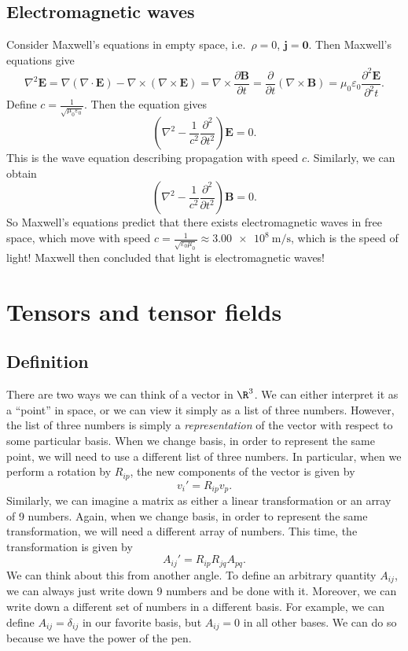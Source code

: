 \documentclass[a4paper]{article}
\begin{document}
\subsection{Electromagnetic waves}
Consider Maxwell's equations in empty space, i.e.\ $\rho = 0$, $\mathbf{j} = \mathbf{0}$. Then Maxwell's equations give
\[
  \nabla^2 \mathbf{E} = \nabla(\nabla\cdot \mathbf{E}) - \nabla\times (\nabla\times \mathbf{E}) = \nabla\times \frac{\partial \mathbf{B}}{\partial t} = \frac{\partial}{\partial t} (\nabla \times \mathbf{B}) = \mu_0\varepsilon_0 \frac{\partial^2 \mathbf{E}}{\partial^2 t}.
\]
Define $c = \frac{1}{\sqrt{\mu_0\varepsilon_0}}$. Then the equation gives
\[
  \left(\nabla^2 - \frac{1}{c^2}\frac{\partial^2}{\partial t^2}\right)\mathbf{E} = 0.
\]
This is the wave equation describing propagation with speed $c$. Similarly, we can obtain
\[
  \left(\nabla^2 - \frac{1}{c^2}\frac{\partial^2}{\partial t^2}\right)\mathbf{B} = 0.
\]
So Maxwell's equations predict that there exists electromagnetic waves in free space, which move with speed $c = \frac{1}{\sqrt{\varepsilon_0 \mu_0}} \approx \SI{3.00e8}{\meter\per\second}$, which is the speed of light! Maxwell then concluded that light is electromagnetic waves!

\section{Tensors and tensor fields}
\subsection{Definition}
There are two ways we can think of a vector in $\R^3$. We can either interpret it as a ``point'' in space, or we can view it simply as a list of three numbers. However, the list of three numbers is simply a \emph{representation} of the vector with respect to some particular basis. When we change basis, in order to represent the same point, we will need to use a different list of three numbers. In particular, when we perform a rotation by $R_{ip}$, the new components of the vector is given by
\[
  v_i' = R_{ip}v_p.
\]
Similarly, we can imagine a matrix as either a linear transformation or an array of 9 numbers. Again, when we change basis, in order to represent the same transformation, we will need a different array of numbers. This time, the transformation is given by
\[
  A_{ij}' = R_{ip}R_{jq}A_{pq}.
\]
We can think about this from another angle. To define an arbitrary quantity $A_{ij}$, we can always just write down 9 numbers and be done with it. Moreover, we can write down a different set of numbers in a different basis. For example, we can define $A_{ij} = \delta_{ij}$ in our favorite basis, but $A_{ij} = 0$ in all other bases. We can do so because we have the power of the pen.
\end{document}
